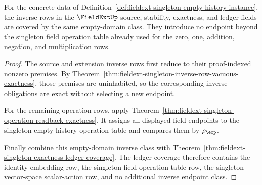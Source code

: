 \begin{theorem}
\label{thm:fieldext-singleton-inverse-ledger-coverage}
For the concrete data of
Definition~\ref{def:fieldext-singleton-empty-history-instance}, the inverse
rows in the $\FieldExtUp$ source, stability, exactness, and ledger fields are
covered by the same empty-domain class. They introduce no endpoint beyond the
singleton field operation table already used for the zero, one, addition,
negation, and multiplication rows.
\end{theorem}
\begin{proof}
The source and extension inverse rows first reduce to their proof-indexed
nonzero premises. By
Theorem~\ref{thm:fieldext-singleton-inverse-row-vacuous-exactness}, those
premises are uninhabited, so the corresponding inverse obligations are exact
without selecting a new endpoint.

For the remaining operation rows, apply
Theorem~\ref{thm:fieldext-singleton-operation-readback-exactness}. It assigns
all displayed field endpoints to the singleton empty-history operation table
and compares them by $\rho_{\emp}$.

Finally combine this empty-domain inverse class with
Theorem~\ref{thm:fieldext-singleton-exactness-ledger-coverage}. The ledger
coverage therefore contains the identity embedding row, the singleton field
operation table row, the singleton vector-space scalar-action row, and no
additional inverse endpoint class.
\end{proof}

